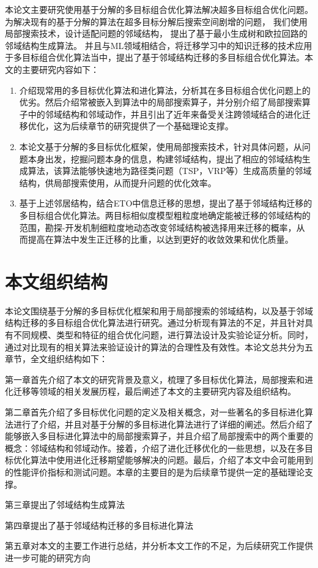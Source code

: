 本论文主要研究使用基于分解的多目标组合优化算法解决超多目标组合优化问题。
为解决现有的基于分解的算法在超多目标分解后搜索空间剧增的问题，
我们使用局部搜索技术，设计适配问题的邻域结构，
提出了基于最小生成树和欧拉回路的邻域结构生成算法。
并且与ML领域相结合，将迁移学习中的知识迁移的技术应用于多目标组合优化算法当中，提出了基于邻域结构迁移的多目标组合优化算法。本文的主要研究内容如下：
\begin{enumerate}
    \item 介绍现常用的多目标优化算法和进化算法，分析其在多目标组合优化问题上的优劣。然后介绍常被嵌入到算法中的局部搜索算子，并分别介绍了局部搜索算子中的邻域结构和邻域动作，并且引出了近年来备受关注跨领域结合的进化迁移优化，这为后续章节的研究提供了一个基础理论支撑。
    \item 本论文基于分解的多目标优化框架，使用局部搜索技术，针对具体问题，从问题本身出发，挖掘问题本身的信息，构建邻域结构，提出了相应的邻域结构生成算法，该算法能够快速地为路径类问题（TSP，VRP等）生成高质量的邻域结构，供局部搜索使用，从而提升问题的优化效率。
    \item 基于上述邻居结构，结合ETO中信息迁移的思想，提出了基于邻域结构迁移的多目标组合优化算法。两目标相似度模型粗粒度地确定能被迁移的邻域结构的范围，勘探-开发机制细粒度地动态改变邻域结构被选择用来迁移的概率，从而提高在算法中发生正迁移的比重，以达到更好的收敛效果和优化质量。
\end{enumerate}

\section{本文组织结构}

本论文围绕基于分解的多目标优化框架和用于局部搜索的邻域结构，以及基于邻域结构迁移的多目标组合优化算法进行研究。通过分析现有算法的不足，并且针对具有不同规模、类型和特征的组合优化问题，进行算法设计及实验论证分析。同时，通过对比现有的相关算法来验证设计的算法的合理性及有效性。本论文总共分为五章节，全文组织结构如下：
\par
第一章首先介绍了本文的研究背景及意义，梳理了多目标优化算法，局部搜索和进化迁移等领域的相关发展历程，最后阐述了本文的主要研究内容及组织结构。
\par
第二章首先介绍了多目标优化问题的定义及相关概念，对一些著名的多目标进化算法进行了介绍，并且对基于分解的多目标进化算法进行了详细的阐述。然后介绍了能够嵌入多目标进化算法中的局部搜索算子，并且介绍了局部搜索中的两个重要的概念：邻域结构和邻域动作。接着，介绍了进化迁移优化的一些思想，以及在多目标优化算法中使用进化迁移期望能够解决的问题。最后，介绍了本文中会可能用到的性能评价指标和测试问题。本章的主要目的是为后续章节提供一定的基础理论支撑。
\par
第三章提出了邻域结构生成算法
\par
第四章提出了基于邻域结构迁移的多目标进化算法
\par
第五章对本文的主要工作进行总结，并分析本文工作的不足，为后续研究工作提供进一步可能的研究方向